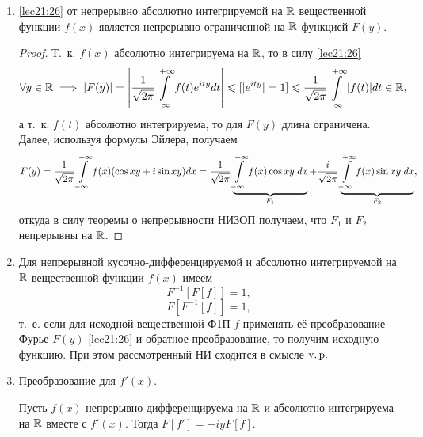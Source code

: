 \documentclass[../../main.tex]{subfiles}
\begin{document}
\begin{enumerate}
  \item \eqref{lec21:26} от непрерывно абсолютно интегрируемой на $\mathbb{R}$ 
  вещественной функции $f(x)$ является непрерывно ограниченной на $\mathbb{R}$ 
  функцией 
  $F(y)$.
  \begin{proof}
    Т.~к. $f(x)$ абсолютно интегрируема на $\mathbb{R}$, то в силу \eqref{lec21:26}
    \begin{multline*}
      \forall y \in \mathbb{R} \implies |F(y)| = \left|\frac{1}{\sqrt{2\pi}} \int\limits_{-\infty}^{+\infty} 
      f(t)e^{ity}dt\right| \leqslant [|e^{ity}| = 1] \leqslant \frac{1}{\sqrt{2\pi}} 
      \int\limits_{-\infty}^{+\infty}|f(t)|dt \in \mathbb{R},
    \end{multline*}
    а т.~к. $f(t)$ абсолютно интегрируема, то для $F(y)$ 
    длина ограничена. Далее, используя формулы Эйлера, получаем
    \begin{multline*}
      F(y) = \frac{1}{\sqrt{2\pi}} \int\limits_{-\infty}^{+\infty} f(x) (\cos xy + i\sin xy)dx = 
      \frac{1}{\sqrt{2\pi}}
      \underbrace{\int\limits_{-\infty}^{+\infty} f(x) \cos xy\;dx}_{F_1} + \frac{i}{\sqrt{2\pi}} 
      \underbrace{\int\limits_{-\infty}^{+\infty} f(x) \sin xy\;dx}_{F_2},
    \end{multline*}
    откуда в силу теоремы о непрерывности НИЗОП получаем, что $F_1$ и 
    $F_2$ непрерывны на $\mathbb{R}$.
  \end{proof}
  
  \item Для непрерывной кусочно-дифференцируемой и абсолютно интегрируемой 
  на $\mathbb{R}$ вещественной функции $f(x)$ имеем  \[F^{-1}[F[f]] = 1,\] 
  \[F[F^{-1}[f]] = 1,\] т.~е. если для исходной вещественной Ф1П $f$ 
  применять её преобразование Фурье $F(y)$ \eqref{lec21:26} и обратное 
  преобразование, то получим исходную функцию. При этом рассмотренный НИ 
  сходится в смысле $\operatorname{v.p.}$
  
  \item Преобразование для $f'(x)$.
  
  Пусть $f(x)$ непрерывно дифференцируема на $\mathbb{R}$ и абсолютно интегрируема 
  на $\mathbb{R}$ вместе с $f'(x)$. Тогда $F[f'] = -iyF[f]$.
  

\end{enumerate}
\end{document}
